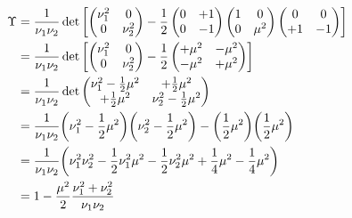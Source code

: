 \documentclass[
	english,
	a4paper,
	fontsize=10pt,
	parskip=half,
	titlepage=true,
	DIV=12,
	final
]{scrreprt}
\begin{document}
\begin{align}
	\Upsilon
&=
	\frac{1}{\nu_1 \nu_2}
	\det\qty[
		\begin{pmatrix}
			\nu_1^2 & 0 \\
			0 & \nu_2^2
		\end{pmatrix}
		-
		\frac{1}{2}
		\begin{pmatrix}
			 0 & +1 \\
			 0 & -1
		\end{pmatrix}
		\begin{pmatrix}
			1 & 0 \\
			0 & \mu^2
		\end{pmatrix}
		\begin{pmatrix}
			 0 &  0 \\
			+1 & -1
		\end{pmatrix}
	] \\
&=
	\frac{1}{\nu_1 \nu_2}
	\det\qty[
		\begin{pmatrix}
			\nu_1^2 & 0 \\
			0 & \nu_2^2
		\end{pmatrix}
		-
		\frac{1}{2}
		\begin{pmatrix}
			+\mu^2		&	-\mu^2 \\
			-\mu^2		&	+\mu^2
		\end{pmatrix}
	]
	\\
&=
	\frac{1}{\nu_1 \nu_2}
	\det \begin{pmatrix}
		\nu_1^2 - \frac{1}{2} \mu^2	& + \frac{1}{2} \mu^2 \\
		+ \frac{1}{2} \mu^2					& \nu_2^2 - \frac{1}{2} \mu^2
	\end{pmatrix} \\
&=
	\frac{1}{\nu_1 \nu_2}
	\qty(\nu_1^2 - \frac{1}{2} \mu^2) %
	\qty(\nu_2^2 - \frac{1}{2} \mu^2)
	-
	\qty(\frac{1}{2} \mu^2)
	\qty(\frac{1}{2} \mu^2) \\
&=
	\frac{1}{\nu_1 \nu_2} \qty(
		  \nu_1^2 \nu_2^2 
		- \frac{1}{2} \nu_1^2 \mu^2
		- \frac{1}{2} \nu_2^2 \mu^2
		+ \frac{1}{4} \mu^2
		- \frac{1}{4} \mu^2
	) \\
&=
	1 - 
	\frac
		{\mu^2}
		{2}
	\frac
		{\nu_1^2  +  \nu_2^2}
		{\nu_1 \nu_2}
\end{align}
\end{document}
